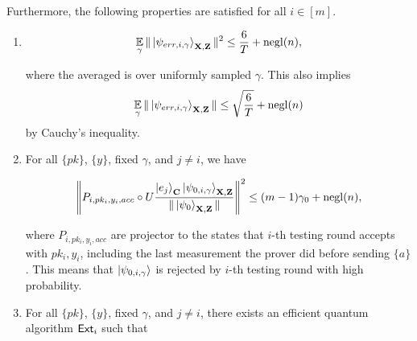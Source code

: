 \begin{lemma}
 


Furthermore, the following properties are satisfied for all $i\in[m]$.
%
\begin{enumerate}
    \item \label{property:partition-err}  $$\operatorname*{\mathbb{E}}_{\gamma}\|\ket{\psi_{err,i,\gamma}}_{\mathbf{X},\mathbf{Z}}\|^2 \leq \frac{6}{T}+\operatorname{negl}(n),$$
    
    where the averaged is over uniformly sampled $\gamma$. This also implies
    \begin{align}
        \operatorname*{\mathbb{E}}_{\gamma}\|\ket{\psi_{err,i,\gamma}}_{\mathbf{X},\mathbf{Z}}\| \leq \sqrt{\frac{6}{T}}+\operatorname{negl}(n)
    \end{align}
by Cauchy's inequality.
    
        \item \label{property:partition-testing}
For all $\{pk\}$, $\{y\}$, fixed $\gamma$, and  $j\neq i$, we have 
 

 \begin{align}
    \left\lVert P_{i,pk_i,y_i,acc} \circ U\frac{\ket{e_j}_{\mathbf{C}}\ket{\psi_{0,i,\gamma}}_{\mathbf{X},\mathbf{Z}}}{\|\ket{\psi_0}_{\mathbf{X},\mathbf{Z}}\|}\right\rVert^2 \leq (m-1)\gamma_0+\operatorname{negl}(n),
 \end{align}
 
 
where $P_{i,pk_i,y_i,acc}$ are projector to the states that $i$-th testing round accepts with $pk_i,y_i$, including the last measurement the prover did before sending $\{a\}$.  This means that $\ket{\psi_{0,i,\gamma}}$ is rejected by $i$-th testing round with high probability.


    \item \label{property:partition-binding}
    
For all $\{pk\}$, $\{y\}$, fixed $\gamma$, and $j\neq i$, there exists an efficient quantum algorithm $\mathsf{Ext}_i$ such that 


\end{enumerate}
\end{lemma}
